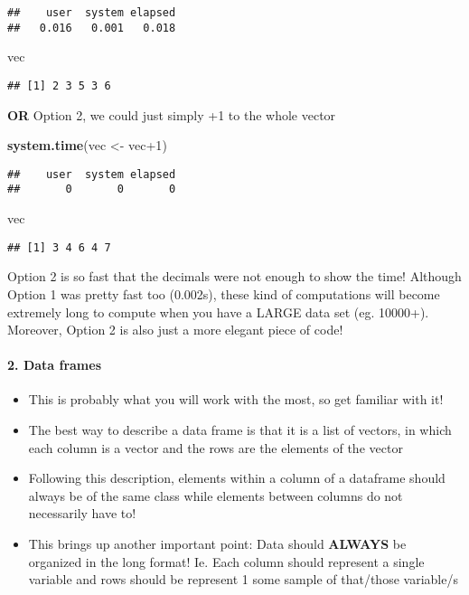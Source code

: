 \documentclass[]{article}
\newenvironment{Shaded}{\begin{snugshade}}{\end{snugshade}}
\newcommand{\KeywordTok}[1]{\textcolor[rgb]{0.13,0.29,0.53}{\textbf{{#1}}}}
\newcommand{\DecValTok}[1]{\textcolor[rgb]{0.00,0.00,0.81}{{#1}}}
\newcommand{\StringTok}[1]{\textcolor[rgb]{0.31,0.60,0.02}{{#1}}}
\newcommand{\NormalTok}[1]{{#1}}
\providecommand{\tightlist}{%
  \setlength{\itemsep}{0pt}\setlength{\parskip}{0pt}}
\let\oldparagraph\paragraph
\renewcommand{\paragraph}[1]{\oldparagraph{#1}\mbox{}}
\begin{document}
\begin{verbatim}
##    user  system elapsed 
##   0.016   0.001   0.018
\end{verbatim}

\begin{Shaded}
\begin{Highlighting}[]
\NormalTok{vec}
\end{Highlighting}
\end{Shaded}

\begin{verbatim}
## [1] 2 3 5 3 6
\end{verbatim}

\textbf{OR} Option 2, we could just simply +1 to the whole vector

\begin{Shaded}
\begin{Highlighting}[]
\KeywordTok{system.time}\NormalTok{(vec <-}\StringTok{ }\NormalTok{vec}\DecValTok{+1}\NormalTok{)}
\end{Highlighting}
\end{Shaded}

\begin{verbatim}
##    user  system elapsed 
##       0       0       0
\end{verbatim}

\begin{Shaded}
\begin{Highlighting}[]
\NormalTok{vec}
\end{Highlighting}
\end{Shaded}

\begin{verbatim}
## [1] 3 4 6 4 7
\end{verbatim}

Option 2 is so fast that the decimals were not enough to show the time!
Although Option 1 was pretty fast too (0.002s), these kind of
computations will become extremely long to compute when you have a LARGE
data set (eg. 10000+). Moreover, Option 2 is also just a more elegant
piece of code!

\paragraph{2. Data frames}\label{data-frames}

\begin{itemize}
\tightlist
\item
  This is probably what you will work with the most, so get familiar
  with it!
\item
  The best way to describe a data frame is that it is a list of vectors,
  in which each column is a vector and the rows are the elements of the
  vector
\item
  Following this description, elements within a column of a dataframe
  should always be of the same class while elements between columns do
  not necessarily have to!
\item
  This brings up another important point: Data should \textbf{ALWAYS} be
  organized in the long format! Ie. Each column should represent a
  single variable and rows should be represent 1 some sample of
  that/those variable/s
\end{itemize}
\end{document}
